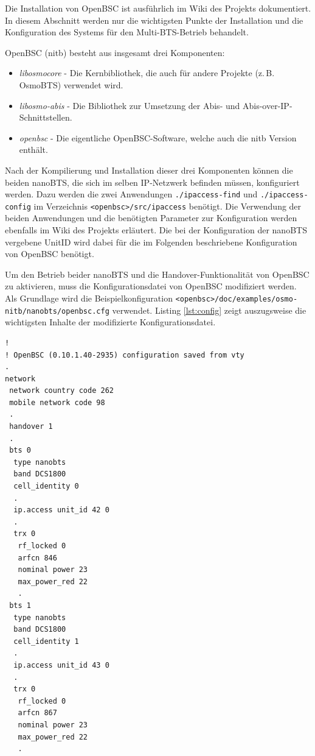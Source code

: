 Die Installation von OpenBSC ist ausführlich im Wiki des Projekts \cite{bib:buildopenbsc} dokumentiert. In diesem Abschnitt werden nur die wichtigsten Punkte der Installation und die Konfiguration des Systems für den Multi-BTS-Betrieb behandelt.

OpenBSC (nitb) besteht aus insgesamt drei Komponenten:

\begin{itemize}
 \item \textit{libosmocore} - Die Kernbibliothek, die auch für andere Projekte (z.\,B. OsmoBTS) verwendet wird.
 \item \textit{libosmo-abis} - Die Bibliothek zur Umsetzung der Abis- und Abis-over-IP-Schnittstellen.
 \item \textit{openbsc} - Die eigentliche OpenBSC-Software, welche auch die nitb Version enthält.
\end{itemize}

Nach der Kompilierung und Installation dieser drei Komponenten können die beiden nanoBTS, die sich im selben IP-Netzwerk befinden müssen, konfiguriert werden. Dazu werden die zwei Anwendungen \lstinline{./ipaccess-find} und \lstinline{./ipaccess-config} im Verzeichnis \lstinline{<openbsc>/src/ipaccess} benötigt. Die Verwendung der beiden Anwendungen und die benötigten Parameter zur Konfiguration werden ebenfalls im Wiki des Projekts \cite{bib:ipaccess} erläutert. Die bei der Konfiguration der nanoBTS vergebene UnitID wird dabei für die im Folgenden beschriebene Konfiguration von OpenBSC benötigt.

Um den Betrieb beider nanoBTS und die Handover-Funktionalität von OpenBSC zu aktivieren, muss die Konfigurationsdatei von OpenBSC modifiziert werden. Als Grundlage wird die Beispielkonfiguration \lstinline{<openbsc>/doc/examples/osmo-nitb/nanobts/openbsc.cfg} verwendet. Listing \ref{lst:config} zeigt auszugsweise die wichtigsten Inhalte der modifizierte Konfigurationsdatei.

\begin{lstlisting}[label=lst:config,caption=OpenBSC Konfigurationsdatei (Auszug)]
!
! OpenBSC (0.10.1.40-2935) configuration saved from vty
.
network
 network country code 262
 mobile network code 98
 .
 handover 1
 .
 bts 0
  type nanobts
  band DCS1800
  cell_identity 0
  .
  ip.access unit_id 42 0
  .
  trx 0
   rf_locked 0
   arfcn 846
   nominal power 23
   max_power_red 22
   .
 bts 1
  type nanobts
  band DCS1800
  cell_identity 1
  .
  ip.access unit_id 43 0
  .
  trx 0
   rf_locked 0
   arfcn 867
   nominal power 23
   max_power_red 22
   .
\end{lstlisting}

